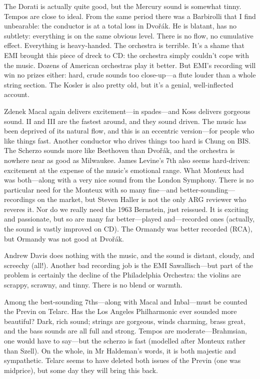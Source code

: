 \documentclass[12pt]{article}%
\begin{document}
The Dorati is actually quite good, but the Mercury sound is somewhat tinny. Tempos are close to ideal. From the same period there was a Barbirolli that I find unbearable: the conductor is at a total loss in Dvořák. He is blatant, has no subtlety: everything is on the same obvious level. There is no flow, no cumulative effect. Everything is heavy-handed. The orchestra is terrible. It's a shame that EMI brought this piece of dreck to CD: the orchestra simply couldn't cope with the music.
Dozens of American orchestras play it better.
But EMI's recording will win no prizes either: hard, crude sounds too close-up---a
flute louder than a whole string section. The Kosler is also pretty old,
but it's a genial, well-inflected account.

Zdenek Macal again delivers excitement---in spades---and Koss delivers gorgeous sound.
II and III are the fastest around, and they sound driven.
The music has been deprived of its natural flow, and this is an eccentric version---for people who like things fast. Another conductor who drives things too hard is Chung on BIS.
The Scherzo sounds more like Beethoven than Dvořák, and the orchestra is nowhere near as good as Milwaukee. James Levine's 7th also seems hard-driven: excitement at the expense of the music's emotional range. What Monteux had was both---along with a very nice sound from the London Symphony. There is no particular need for the Monteux with so many fine---and better-sounding---recordings on the market, but Steven Haller is not the only ARG reviewer who reveres it. Nor do we really need the 1963 Bernstein, just reissued. It is exciting and passionate, but so are many far better---played and---recorded ones (actually, the sound is vastly improved on CD). The Ormandy was better recorded (RCA), but Ormandy was not good at Dvořák.

Andrew Davis does nothing with the music, and the sound is distant, cloudy, and screechy (all!). Another bad recording job is the EMI Sawallisch---but part of the problem is certainly the decline of the Philadelphia Orchestra: the violins are scrappy, scrawny, and tinny. There is no blend or warmth.

Among the best-sounding 7ths---along with Macal and Inbal---must be counted the Previn on Telarc. Has the Los Angeles Philharmonic ever sounded more beautiful? Dark, rich sound; strings are gorgeous, winds charming, brass great, and the bass sounds are all full and strong. Tempos are moderate---Brahmsian,
one would have to say---but the scherzo is fast (modelled after Monteux rather than Szell). On the whole, in Mr Haldeman's words, it is both majestic and sympathetic. Telarc seems to have deleted both issues of the Previn
(one was midprice), but some day they will bring this back.
\end{document}
